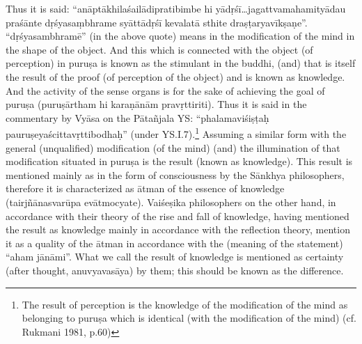 Thus it is said: “anāptākhilaśailādipratibimbe hi yādṛśī…jagattvamaha\-mityādau praśānte dṛśyasaṃbhrame syāttādṛśī kevalatā sthite draṣṭa\-ryavīkṣaṇe”. “dṛśyasambhramē” (in the above quote) means in the modification of the mind in the shape of the object. And this which is connected with the object (of perception) in puruṣa is known as the stimulant in the buddhi, (and) that is itself the result of the proof (of perception of the object) and is known as knowledge. And the activity of the sense organs is for the sake of achieving the goal of puruṣa (puruṣārtham hi karaṇānām pravṛttiriti). Thus it is said in the commentary by Vyāsa on the Pātañjala YS: “phalamaviśiṣṭaḥ pauruṣeyaścittavṛttibodhaḥ” (under YS.I.7).\footnote{The result of perception is the knowledge of the modification of the mind as belonging to puruṣa which is identical (with the modification of the mind) (cf. Rukmani 1981, p.60)} Assuming a similar form with the general (unqualified) modification (of the mind) (and) the illumination of that modification situated in puruṣa is the result (known as knowledge). This result is mentioned mainly as in the form of consciousness by the Sānkhya philosophers, therefore it is characterized as ātman of the essence of knowledge (tairjñānasvarūpa evātmocyate). Vaiśeṣika philosophers on the other hand, in accordance with their theory of the rise and fall of knowledge, having mentioned the result as knowledge mainly in accordance with the reflection theory, mention it as a quality of the ātman in accordance with the (meaning of the statement) “aham jānāmi”. What we call the result of knowledge is mentioned as certainty (after thought, anuvyavasāya) by them; this should be known as the difference.




